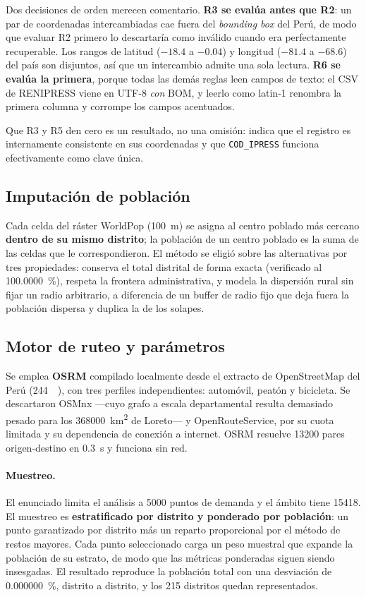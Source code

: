 \documentclass[11pt,a4paper]{article}
\begin{document}
Dos decisiones de orden merecen comentario. \textbf{R3 se evalúa antes que R2}: un par de
coordenadas intercambiadas cae fuera del \emph{bounding box} del Perú, de modo que evaluar R2
primero lo descartaría como inválido cuando era perfectamente recuperable. Los rangos de
latitud ($-18.4$ a $-0.04$) y longitud ($-81.4$ a $-68.6$) del país son disjuntos, así que un
intercambio admite una sola lectura. \textbf{R6 se evalúa la primera}, porque todas las demás
reglas leen campos de texto: el CSV de RENIPRESS viene en UTF-8 \emph{con} BOM, y leerlo como
latin-1 renombra la primera columna y corrompe los campos acentuados.

Que R3 y R5 den cero es un resultado, no una omisión: indica que el registro es internamente
consistente en sus coordenadas y que \texttt{COD\_IPRESS} funciona efectivamente como clave
única.

\subsection{Imputación de población}

Cada celda del ráster WorldPop (\SI{100}{\meter}) se asigna al centro poblado más cercano
\textbf{dentro de su mismo distrito}; la población de un centro poblado es la suma de las
celdas que le correspondieron. El método se eligió sobre las alternativas por tres
propiedades: conserva el total distrital de forma exacta (verificado al
\SI{100.0000}{\percent}), respeta la frontera administrativa, y modela la dispersión rural sin
fijar un radio arbitrario, a diferencia de un buffer de radio fijo que deja fuera la población
dispersa y duplica la de los solapes.

\subsection{Motor de ruteo y parámetros}

Se emplea \textbf{OSRM} compilado localmente desde el extracto de OpenStreetMap del Perú
(\SI{244}{\mega\byte}), con tres perfiles independientes: automóvil, peatón y bicicleta.
Se descartaron OSMnx —cuyo grafo a escala departamental resulta demasiado pesado para los
\SI{368000}{\kilo\meter\squared} de Loreto— y OpenRouteService, por su cuota limitada y su
dependencia de conexión a internet. OSRM resuelve \num{13200} pares origen-destino en
\SI{0.3}{\second} y funciona sin red.

\paragraph{Muestreo.} El enunciado limita el análisis a \num{5000} puntos de demanda y el
ámbito tiene \num{15418}. El muestreo es \textbf{estratificado por distrito y ponderado por
población}: un punto garantizado por distrito más un reparto proporcional por el método de
restos mayores. Cada punto seleccionado carga un peso muestral que expande la población de su
estrato, de modo que las métricas ponderadas siguen siendo insesgadas. El resultado reproduce
la población total con una desviación de \SI{0.000000}{\percent}, distrito a distrito, y los
\num{215} distritos quedan representados.
\end{document}
